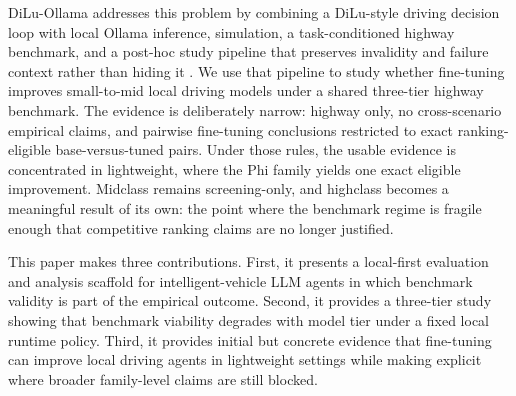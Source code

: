 DiLu-Ollama addresses this problem by combining a DiLu-style driving decision loop with local Ollama inference,  simulation, a task-conditioned highway benchmark, and a post-hoc study pipeline that preserves invalidity and failure context rather than hiding it \cite{wen2023dilu,leurent2018highwayenv}. We use that pipeline to study whether fine-tuning improves small-to-mid local driving models under a shared three-tier highway benchmark. The evidence is deliberately narrow: highway only, no cross-scenario empirical claims, and pairwise fine-tuning conclusions restricted to exact ranking-eligible base-versus-tuned pairs. Under those rules, the usable evidence is concentrated in lightweight, where the Phi family yields one exact eligible improvement. Midclass remains screening-only, and highclass becomes a meaningful result of its own: the point where the benchmark regime is fragile enough that competitive ranking claims are no longer justified.

This paper makes three contributions. First, it presents a local-first evaluation and analysis scaffold for intelligent-vehicle LLM agents in which benchmark validity is part of the empirical outcome. Second, it provides a three-tier study showing that benchmark viability degrades with model tier under a fixed local runtime policy. Third, it provides initial but concrete evidence that fine-tuning can improve local driving agents in lightweight settings while making explicit where broader family-level claims are still blocked.
